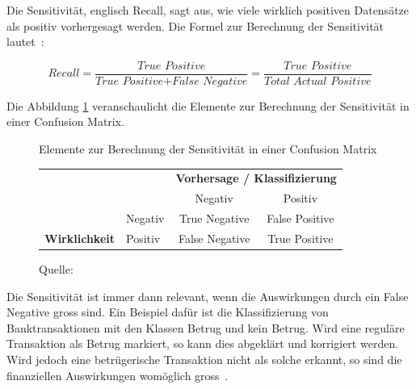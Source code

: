 Die Sensitivität, englisch Recall, sagt aus, wie viele wirklich positiven Datensätze als positiv vorhergesagt werden. Die Formel zur Berechnung der Sensitivität lautet~\autocite{TDSAccuracy}: 

\nopagebreak

$$\textit{Recall} = \frac{\textit{True Positive}}{\textit{True Positive} + \textit{False Negative}} = \frac{\textit{True Positive}}{\textit{Total Actual Positive}}$$
\vspace*{0.2cm}

Die Abbildung \ref{cm-recall} veranschaulicht die Elemente zur Berechnung der Sensitivität in einer Confusion Matrix.

\begin{figure}[h!]
    \centering
    \captionsetup{width=.9\linewidth}
    \caption{Elemente zur Berechnung der Sensitivität in einer Confusion Matrix}
    \def\arraystretch{1.5}
    \begin{tabular}{llcc}
        \multicolumn{2}{l}{}                                                                                                & \multicolumn{2}{c}{\textbf{Vorhersage / Klassifizierung}}                                                                \\ \cline{3-4} 
        \multicolumn{1}{c}{\textbf{}}                                & \multicolumn{1}{l|}{}                                & \multicolumn{1}{c|}{Negativ}                                & \multicolumn{1}{c|}{Positiv}                               \\ \cline{2-4} 
        \multicolumn{1}{l|}{}                                        & \multicolumn{1}{l|}{Negativ}                         & \multicolumn{1}{c|}{True Negative}                          & \multicolumn{1}{c|}{False Positive}                        \\ \cline{2-4} 
        \multicolumn{1}{l|}{\multirow{-2}{*}{\textbf{Wirklichkeit}}} & \multicolumn{1}{l|}{\cellcolor[HTML]{B5D0EE}Positiv} & \multicolumn{1}{c|}{\cellcolor[HTML]{B5D0EE}False Negative} & \multicolumn{1}{c|}{\cellcolor[HTML]{B5D0EE}True Positive} \\ \cline{2-4} 
    \end{tabular}
    \vspace*{0.3cm}
    \caption*{Quelle: \textcite{TDSAccuracy}}
    \label{cm-recall}
\end{figure}

Die Sensitivität ist immer dann relevant, wenn die Auswirkungen durch ein False Negative gross sind. Ein Beispiel dafür ist die Klassifizierung von Banktransaktionen mit den Klassen Betrug und kein Betrug. Wird eine reguläre Transaktion als Betrug markiert, so kann dies abgeklärt und korrigiert werden. Wird jedoch eine betrügerische Transaktion nicht als solche erkannt, so sind die finanziellen Auswirkungen womöglich gross~\autocite{TDSAccuracy}.

